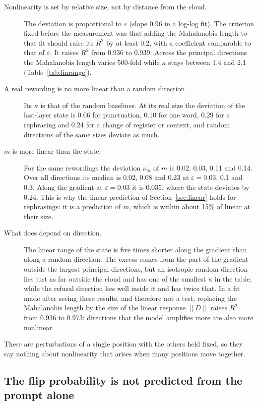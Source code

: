 \documentclass[11pt]{article}
\begin{document}
\begin{description}
\item[Nonlinearity is set by relative size, not by distance from the cloud.] The deviation is proportional to $\varepsilon$ (slope 0.96 in a log-log fit). The criterion fixed before the measurement was that adding the Mahalanobis length to that fit should raise its $R^2$ by at least 0.2, with a coefficient comparable to that of $\varepsilon$. It raises $R^2$ from 0.936 to 0.939. Across the principal directions the Mahalanobis length varies 500-fold while $\kappa$ stays between 1.4 and 2.1 (Table~\ref{tab:linrange}).
\item[A real rewording is no more linear than a random direction.] Its $\kappa$ is that of the random baselines. At its real size the deviation of the last-layer state is 0.06 for punctuation, 0.10 for one word, 0.29 for a rephrasing and 0.24 for a change of register or context, and random directions of the same sizes deviate as much.
\item[$m$ is more linear than the state.] For the same rewordings the deviation $\nu_m$ of $m$ is 0.02, 0.03, 0.11 and 0.14. Over all directions its median is 0.02, 0.08 and 0.23 at $\varepsilon=0.03$, 0.1 and 0.3. Along the gradient at $\varepsilon=0.03$ it is 0.035, where the state deviates by 0.24. This is why the linear prediction of Section~\ref{sec:linear} holds for rephrasings: it is a prediction of $m$, which is within about 15\% of linear at their size.
\item[What does depend on direction.] The linear range of the state is five times shorter along the gradient than along a random direction. The excess comes from the part of the gradient outside the largest principal directions, but an isotropic random direction lies just as far outside the cloud and has one of the smallest $\kappa$ in the table, while the refusal direction lies well inside it and has twice that. In a fit made after seeing these results, and therefore not a test, replacing the Mahalanobis length by the size of the linear response $\lVert D\rVert$ raises $R^2$ from 0.936 to 0.973: directions that the model amplifies more are also more nonlinear.
\end{description}

These are perturbations of a single position with the others held fixed, so they say nothing about nonlinearity that arises when many positions move together.

\subsection{The flip probability is not predicted from the prompt alone}
\label{sec:test}
\end{document}
